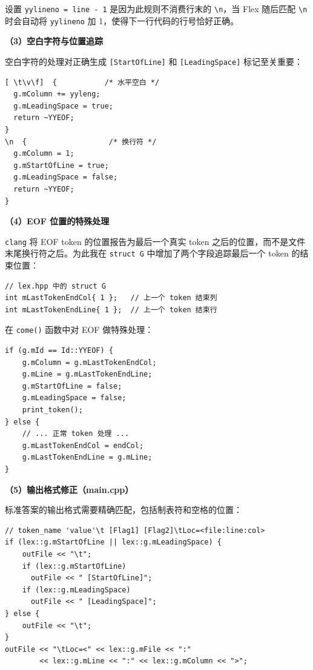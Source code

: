 \documentclass[12pt,a4paper]{article}
\begin{document}
设置 \texttt{yylineno = line - 1} 是因为此规则不消费行末的 \texttt{\textbackslash n}，当 Flex 随后匹配 \texttt{\textbackslash n} 时会自动将 \texttt{yylineno} 加 1，使得下一行代码的行号恰好正确。

\textbf{（3）空白字符与位置追踪}

空白字符的处理对正确生成 \texttt{[StartOfLine]} 和 \texttt{[LeadingSpace]} 标记至关重要：

\begin{lstlisting}[style=flexstyle]
[ \t\v\f]  {           /* 水平空白 */
  g.mColumn += yyleng;
  g.mLeadingSpace = true;
  return ~YYEOF;
}
\n  {                   /* 换行符 */
  g.mColumn = 1;
  g.mStartOfLine = true;
  g.mLeadingSpace = false;
  return ~YYEOF;
}
\end{lstlisting}

\textbf{（4）EOF 位置的特殊处理}

\texttt{clang} 将 EOF token 的位置报告为最后一个真实 token 之后的位置，而不是文件末尾换行符之后。为此我在 \texttt{struct G} 中增加了两个字段追踪最后一个 token 的结束位置：

\begin{lstlisting}[style=cstyle]
// lex.hpp 中的 struct G
int mLastTokenEndCol{ 1 };   // 上一个 token 结束列
int mLastTokenEndLine{ 1 };  // 上一个 token 结束行
\end{lstlisting}

在 \texttt{come()} 函数中对 EOF 做特殊处理：

\begin{lstlisting}[style=cstyle]
if (g.mId == Id::YYEOF) {
    g.mColumn = g.mLastTokenEndCol;
    g.mLine = g.mLastTokenEndLine;
    g.mStartOfLine = false;
    g.mLeadingSpace = false;
    print_token();
} else {
    // ... 正常 token 处理 ...
    g.mLastTokenEndCol = endCol;
    g.mLastTokenEndLine = g.mLine;
}
\end{lstlisting}

\textbf{（5）输出格式修正（main.cpp）}

标准答案的输出格式需要精确匹配，包括制表符和空格的位置：

\begin{lstlisting}[style=cstyle]
// token_name 'value'\t [Flag1] [Flag2]\tLoc=<file:line:col>
if (lex::g.mStartOfLine || lex::g.mLeadingSpace) {
    outFile << "\t";
    if (lex::g.mStartOfLine)
      outFile << " [StartOfLine]";
    if (lex::g.mLeadingSpace)
      outFile << " [LeadingSpace]";
} else {
    outFile << "\t";
}
outFile << "\tLoc=<" << lex::g.mFile << ":"
        << lex::g.mLine << ":" << lex::g.mColumn << ">";
\end{lstlisting}
\end{document}
